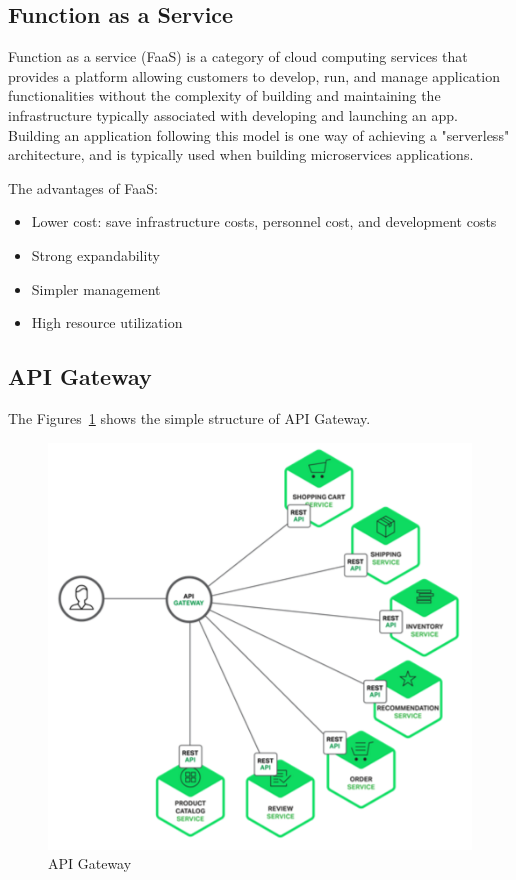 \documentclass[a4paper,12pt]{article}
\begin{document}
\subsection{Function as a Service}
Function as a service (FaaS) is a category of cloud computing services that provides a platform allowing customers to develop, run, and manage application functionalities without the complexity of building and maintaining the infrastructure typically associated with developing and launching an app. Building an application following this model is one way of achieving a "serverless" architecture, and is typically used when building microservices applications\cite{faas}. 

The advantages of FaaS:
\begin{itemize}
	\item Lower cost: save infrastructure costs, personnel cost, and development costs
	\item Strong expandability
	\item Simpler management
	\item High resource utilization
\end{itemize}

\subsection{API Gateway}

The Figures~\ref{fig:apigateway} shows the simple structure of API Gateway.
\begin{figure}[H]
\centering
\label{fig:apigateway}
\includegraphics[scale=0.22]{figures/api-gateway.png}
\caption{API Gateway}
\end{figure}
\end{document}
